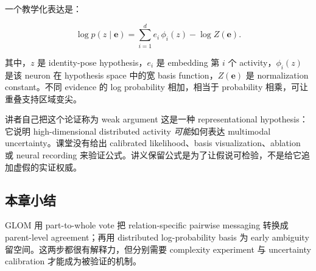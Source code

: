 一个教学化表达是：

\[
\log p(z\mid\mathbf e)=\sum_{i=1}^{d} e_i\,\phi_i(z)-\log Z(\mathbf e).
\]

其中，$z$ 是 identity-pose hypothesis，$e_i$ 是 embedding 第 $i$ 个 activity，$\phi_i(z)$ 是该 neuron 在 hypothesis space 中的宽 basis function，$Z(\mathbf e)$ 是 normalization constant。不同 evidence 的 log probability 相加，相当于 probability 相乘，可让重叠支持区域变尖。

\begin{warningbox}{讲者自己把这个论证称为 weak argument}
这是一种 representational hypothesis：它说明 high-dimensional distributed activity \emph{可能}如何表达 multimodal uncertainty。课堂没有给出 calibrated likelihood、basis visualization、ablation 或 neural recording 来验证公式。讲义保留公式是为了让假说可检验，不是给它追加虚假的实证权威。
\end{warningbox}


\subsection{本章小结}

GLOM 用 part-to-whole vote 把 relation-specific pairwise messaging 转换成 parent-level agreement；再用 distributed log-probability basis 为 early ambiguity 留空间。这两步都很有解释力，但分别需要 complexity experiment 与 uncertainty calibration 才能成为被验证的机制。


